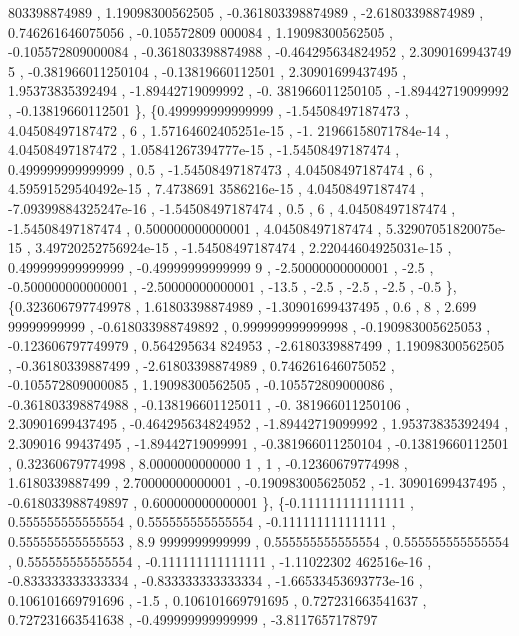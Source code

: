 \begin{DoxyCode}
      803398874989 ,  1.19098300562505 , -0.361803398874989 , -2.61803398874989 , 0.746261646075056 , -0.105572809
      000084 ,  1.19098300562505 , -0.105572809000084 , -0.361803398874988 , -0.464295634824952 ,  2.3090169943749
      5 , -0.381966011250104 , -0.13819660112501 ,  2.30901699437495 ,  1.95373835392494 , -1.89442719099992 , -0.
      381966011250105 , -1.89442719099992 , -0.13819660112501 \},
\{0.499999999999999 , -1.54508497187473 ,  4.04508497187472 ,                 6 , 1.57164602405251e-15 , -1.
      21966158071784e-14 ,  4.04508497187472 , 1.05841267394777e-15 , -1.54508497187474 , 0.499999999999999 ,     
                0.5 , -1.54508497187473 ,  4.04508497187474 ,                 6 , 4.59591529540492e-15 , 7.4738691
      3586216e-15 ,  4.04508497187474 , -7.09399884325247e-16 , -1.54508497187474 ,               0.5 ,           
            6 ,  4.04508497187474 , -1.54508497187474 , 0.500000000000001 ,  4.04508497187474 , 5.32907051820075e-
      15 , 3.49720252756924e-15 , -1.54508497187474 , 2.22044604925031e-15 , 0.499999999999999 , -0.49999999999999
      9 , -2.50000000000001 ,              -2.5 , -0.500000000000001 , -2.50000000000001 ,             -13.5 ,    
                -2.5 ,              -2.5 ,              -2.5 ,              -0.5 \},
\{0.323606797749978 ,  1.61803398874989 , -1.30901699437495 ,               0.6 ,                 8 ,  2.699
      99999999999 , -0.618033988749892 , 0.999999999999998 , -0.190983005625053 , -0.123606797749979 , 0.564295634
      824953 ,  -2.6180339887499 ,  1.19098300562505 , -0.36180339887499 , -2.61803398874989 , 0.746261646075052 ,
       -0.105572809000085 ,  1.19098300562505 , -0.105572809000086 , -0.361803398874988 , -0.138196601125011 , -0.
      381966011250106 ,  2.30901699437495 , -0.464295634824952 , -1.89442719099992 ,  1.95373835392494 ,  2.309016
      99437495 , -1.89442719099991 , -0.381966011250104 , -0.13819660112501 ,  0.32360679774998 ,  8.0000000000000
      1 ,                 1 , -0.12360679774998 ,   1.6180339887499 ,  2.70000000000001 , -0.190983005625052 , -1.
      30901699437495 , -0.618033988749897 , 0.600000000000001 \},
\{-0.111111111111111 , 0.555555555555554 , 0.555555555555554 , -0.111111111111111 , 0.555555555555553 ,  8.9
      9999999999999 , 0.555555555555554 , 0.555555555555554 , 0.555555555555554 , -0.111111111111111 , -1.11022302
      462516e-16 , -0.833333333333334 , -0.833333333333334 , -1.66533453693773e-16 , 0.106101669791696 ,          
          -1.5 , 0.106101669791695 , 0.727231663541637 , 0.727231663541638 , -0.499999999999999 , -3.8117657178797

\end{DoxyCode}
